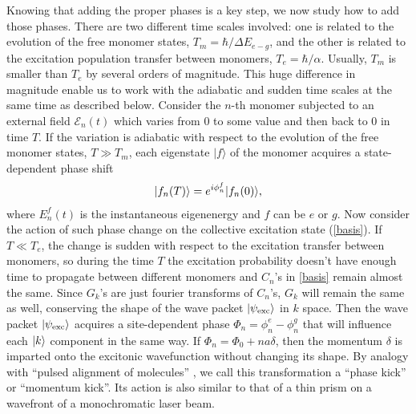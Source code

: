 Knowing that adding the proper phases is a key step, we now study how to add those phases. There are two
 different time scales involved: one is related to the evolution of the free monomer states, 
$T_m = \hbar/\Delta E_{e-g}$, and the other is related to the excitation population transfer between monomers,
 $T_e = \hbar/\alpha$. Usually, $T_m$ is smaller than $T_e$ by several orders of magnitude. This huge
 difference in magnitude enable us to work with the adiabatic and sudden time scales at the same time as described below. 
Consider  the $n$-th monomer subjected to an external field
$\mathcal{E}_n(t)$ which varies from 0 to some value and then back
to 0 in time $T$. If the variation is adiabatic with respect to
the evolution of the free monomer states, $T\gg T_m$, each eigenstate $|f\rangle$ of the monomer acquires a
state-dependent phase shift \cite{adiabatic-theo}
%
\begin{eqnarray}
| f_n (T) \rangle = e^{i \phi_{n}^f}| f_n(0) \rangle,
\label{adiabatic-theorem} \label{phase}
\end{eqnarray}
%
where 
$E_{n}^f (t)$ is the instantaneous eigenenergy and $f$ can be $e$
or $g$.
Now consider the action of such phase change on the collective
excitation state (\ref{basis}). If $T\ll T_e$, the
change is sudden with respect to the excitation transfer between
monomers, so during the time $T$ the excitation probability doesn't have enough time to propagate 
between different monomers and $C_n$'s in \autoref{basis} remain almost the same. Since $G_k$'s are just fourier
transforms of $C_n$'s, $G_k$ will remain the same as well, conserving the shape of the wave packet $|\psi_{\rm exc}\rangle$ in $k$ space. 
 Then the wave packet $|\psi_{\rm exc}\rangle$ acquires a site-dependent
phase $\Phi_n = \phi_{n}^e-\phi_{n}^g$ that will influence each $| k \rangle$ component in the same way. 
If $\Phi_n = \Phi_0 + n a\delta $, then the momentum $\delta$ is imparted onto the
excitonic wavefunction without changing its shape. By analogy with ``pulsed alignment of
molecules'' \cite{alignment-review}, we call this transformation a
``phase kick'' or ``momentum kick''. Its action is also similar to
that of a thin prism on a wavefront of a monochromatic laser beam.

